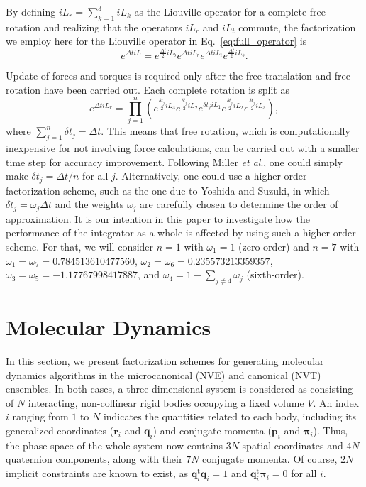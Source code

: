 \documentclass[aip,jcp,reprint,amsmath,amssymb]{revtex4-1}
\newcommand{\vt}[1]{\boldsymbol{\mathbf{#1}}}           %
\newcommand{\tr}[1]{#1^\text{t}}                        %
\begin{document}
By defining $i\!L_r = \sum_{k=1}^3 i\!L_k$ as the Liouville operator for a complete free rotation and realizing that the operators $i\!L_r$ and $i\!L_t$ commute, the factorization we employ here for the Liouville operator in Eq.~\ref{eq:full_operator} is
\begin{equation}
\label{eq:trotter_splitting_NVE}
e^{\Delta t i\!L} = e^{\frac{\Delta t}{2} i\!L_b} e^{\Delta t i\!L_r} e^{\Delta t i\!L_t} e^{\frac{\Delta t}{2} i\!L_b}.
\end{equation}

Update of forces and torques is required only after the free translation and free rotation have been carried out. Each complete rotation is split as\cite{Miller2002}
\begin{equation}
\label{eq:splitting_rot}
e^{\Delta t i\!L_r} = \prod_{j=1}^n \left( e^{\frac{\delta t_j}{2} i\!L_3} e^{\frac{\delta t_j}{2} i\!L_2} e^{\delta t_j i\!L_1} e^{\frac{\delta t_j}{2} i\!L_2} e^{\frac{\delta t_j}{2} i\!L_3} \right),
\end{equation}
where $\sum_{j=1}^n {\delta t}_j = \Delta t$. This means that free rotation, which is computationally inexpensive for not involving force calculations, can be carried out with a smaller time step for accuracy improvement. Following Miller \textit{et al}.,\cite{Miller2002} one could simply make $\delta t_j = \Delta t/n$ for all $j$. Alternatively, one could use a higher-order factorization scheme, such as the one due to Yoshida\cite{Yoshida1990} and Suzuki,\cite{Suzuki1991a, Suzuki1991b} in which $\delta t_j = \omega_j \Delta t$ and the weights $\omega_j$ are carefully chosen to determine the order of approximation. It is our intention in this paper to investigate how the performance of the integrator as a whole is affected by using such a higher-order scheme. For that, we will consider $n = 1$ with $\omega_1 = 1$ (zero-order) and $n = 7$ with $\omega_1 = \omega_7 = 0.784513610477560$, $\omega_2 = \omega_6 = 0.235573213359357$, $\omega_3 = \omega_5 = -1.17767998417887$, and $\omega_4 = 1 - \sum_{j \neq 4} \omega_j$ (sixth-order).

\section{Molecular Dynamics}
\label{sec:molecular_dynamics}

In this section, we present factorization schemes for generating molecular dynamics algorithms in the microcanonical (NVE) and canonical (NVT) ensembles. In both cases, a three-dimensional system is considered as consisting of $N$ interacting, non-collinear rigid bodies occupying a fixed volume $V$. An index $i$ ranging from $1$ to $N$ indicates the quantities related to each body, including its generalized coordinates ($\vt r_i$ and $\vt q_i$) and conjugate momenta ($\vt p_i$ and $\vt \pi_i$). Thus, the phase space of the whole system now contains $3N$ spatial coordinates and $4N$ quaternion components, along with their $7N$ conjugate momenta. Of course, $2N$ implicit constraints are known to exist, as $\tr{\vt q}_i{\vt q}_i = 1$ and $\tr{\vt q}_i{\vt \pi}_i = 0$ for all $i$.
\end{document}
